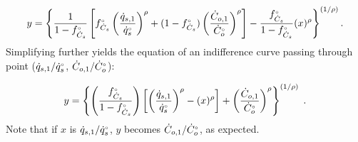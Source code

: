 \begin{equation}
  y = \left\{ \frac{1}{1 - \fCs} \left[ \fCs \left( \frac{\rate{q}_{s,1}}{\rbempl{q}_s} \right)^\rho 
        + (1-\fCs) \left( \frac{\rate{C}_{o,1}}{\rbempl{C}_o} \right)^\rho   \right] 
            - \frac{\fCs}{1 - \fCs} (x)^\rho \right\}^{(1/\rho)}  .
\end{equation}
%
Simplifying further yields
the equation of an indifference curve passing through point 
($\rate{q}_{s,1}/\rbempl{q}_s$, $\rate{C}_{o,1}/\rbempl{C}_o$):

\begin{equation} \label{eq:indiff_curve_eqn}
  y = \left\{ \left( \frac{\fCs}{1 - \fCs} \right) \left[ \left( \frac{\rate{q}_{s,1}}{\rbempl{q}_s} \right)^\rho 
                                                          - (x)^\rho  \right]
        + \left( \frac{\rate{C}_{o,1}}{\rbempl{C}_{o}} \right)^\rho \right\}^{(1/\rho)} \; .
\end{equation}
%
Note that if $x$ is $\rate{q}_{s,1}/\rbempl{q}_s$,
$y$ becomes $\rate{C}_{o,1}/\rbempl{C}_o$,
as expected.
